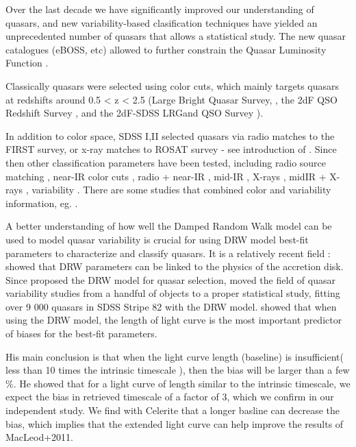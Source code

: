 \documentclass[modern]{aastex62}
\begin{document}
Over the last decade we have significantly improved our understanding of quasars, and new variability-based clasification techniques \citep{fan2001, richards2006, kozlowski2010, palanque2011, macleod2011, graham2014, alsayyad2016, ruan2017} have yielded an unprecedented number of quasars that allows a statistical study. The new quasar catalogues (eBOSS, etc) allowed  to further constrain the Quasar Luminosity Function \citep{ross2013, myers2015, palanque2016}.

Classically quasars were selected using color cuts,  which mainly targets quasars at redshifts around 0.5 < z < 2.5 (Large Bright Quasar Survey, \cite{hewett1995}, the 2dF QSO Redshift Survey \cite{croom2004}, and the 2dF-SDSS LRGand QSO Survey \cite{croom2009}).


In addition to color space, SDSS I,II selected quasars via radio matches to the FIRST survey, or x-ray matches to ROSAT survey  - see introduction of \citep{myers2015}. Since then other classification parameters have been tested, including radio source matching \citep{mcgreer2009}, near-IR color cuts \citep{banerji2012},  radio + near-IR \citep{glikman2012}, mid-IR \citep{stern2005, richards2009a, stern2012}, X-rays \citep{trichas2012},  midIR + X-rays \citep{lacy2004, hickox2007, hickox2009}, variability \citep{schmidt2010, butler2011, macleod2011, palanque2011}. There are some studies that combined color and variability information, eg. \cite{tie2017, peters2016, sesar2007}. 



 
A better understanding of how well the Damped Random Walk model can be used to model quasar variability is crucial for using DRW model best-fit parameters to characterize and classify quasars. It is a relatively recent field : \cite{kelly2009} showed that DRW parameters can be linked to the physics of the accretion disk. Since \cite{kozlowski2010} proposed the DRW model for quasar selection, \cite{macleod2010} moved the field of quasar variability studies from a handful of objects to a proper statistical study, fitting over 9 000 quasars in SDSS Stripe 82 with the DRW model. \cite{kozlowski2017} showed that when using the  DRW model, the length of light curve is the most important predictor of biases for the best-fit parameters. 

His main conclusion is that when the light curve length (baseline) is insufficient( less than 10 times the intrinsic timescale ), then the bias will be larger than a few \%. He showed that for a light curve of length similar to the intrinsic timescale, we expect the bias in retrieved timescale of a factor of 3, which we confirm in our independent study.  We find with Celerite that a longer basline can decrease the bias, which implies that the extended light curve can help improve the results of MacLeod+2011.  
\end{document}

